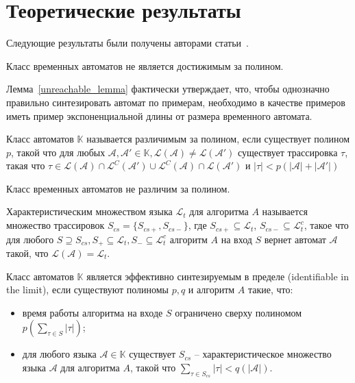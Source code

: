 \documentclass[times,specification,annotation]{itmo-student-thesis}
\begin{document}
\section{Теоретические результаты}
Следующие результаты были получены авторами статьи~\cite{1-dta}.

\begin{lemma}
  Класс временных автоматов не является достижимым за полином.
  \label{unreachable_lemma}
\end{lemma}

Лемма~\ref{unreachable_lemma} фактически утверждает, что, чтобы однозначно правильно синтезировать 
автомат по примерам, необходимо в качестве примеров иметь пример экспоненциальной длины от размера временного автомата.

\begin{definition}
  Класс автоматов $\mathbb{K}$ называется различимым за полином, если существует полином $p$, такой что для любых
  $\mathcal{A}, \mathcal{A'} \in \mathbb{K}, \mathcal{L}(\mathcal{A}) \neq \mathcal{L}(\mathcal{A'})$ существует трассировка $\tau$, такая что 
  $\tau \in \mathcal{L}(\mathcal{A}) \cap \mathcal{L}^C(\mathcal{A'}) \cup \mathcal{L}^C(\mathcal{A}) \cap \mathcal{L}(\mathcal{A'})$ и $|\tau| < p(|\mathcal{A}| + |\mathcal{A'}|)$
\end{definition}

\begin{lemma}
  Класс временных автоматов не различим за полином.
  \label{distinguishability_lemma}
\end{lemma}

\begin{definition}
    Характеристическим множеством языка $\mathcal{L}_t$ для алгоритма $A$ называется множество трассировок $S_{cs} = \{S_{cs+}, S_{cs-}\}$, где
  $S_{cs+} \subseteq \mathcal{L}_t$, $S_{cs-} \subseteq \mathcal{L}_t^c$, такое что 
  для любого $S \supseteq S_{cs}, S_+ \subseteq \mathcal{L}_t, S_- \subseteq \mathcal{L}_t^c$ алгоритм $A$ на вход $S$ вернет автомат $\mathcal{A}$ такой, что $\mathcal{L}(\mathcal{A}) = \mathcal{L}_t$.
\end{definition}

\begin{definition}
  Класс автоматов $\mathbb{K}$ является эффективно синтезируемым в пределе (identifiable in the limit), если существуют полиномы $p, q$ и алгоритм $A$ такие, что:
  \begin{itemize}
    \item время работы алгоритма на входе $S$ ограничено сверху полиномом $p(\mathop{\sum}\limits_{\tau \in S}|\tau|)$;
    \item для любого языка $\mathcal{A} \in \mathbb{K}$ существует $S_{cs} $ 
      -- характеристическое множество языка $\mathcal{A}$ для алгоритма $A$, такой что $\mathop{\sum}\limits_{\tau \in S_{cs}}|\tau| < q(|\mathcal{A}|)$.
  \end{itemize}
\end{definition}
\end{document}

